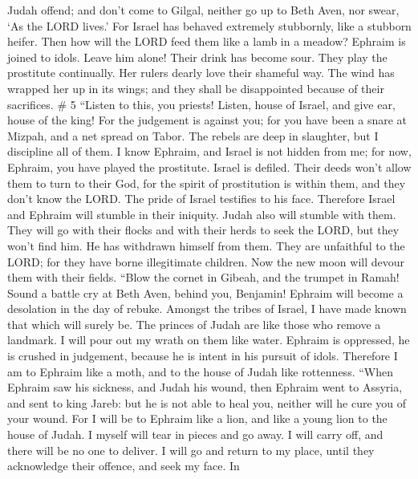 Judah offend; and don't come to Gilgal, neither go up to Beth Aven, nor
swear, `As the LORD lives.'  For Israel has behaved
extremely stubbornly, like a stubborn heifer. Then how will the LORD
feed them like a lamb in a meadow?  Ephraim is joined to
idols. Leave him alone!  Their drink has become sour.
They play the prostitute continually. Her rulers dearly love their
shameful way.  The wind has wrapped her up in its wings;
and they shall be disappointed because of their sacrifices. \# 5
 ``Listen to this, you priests! Listen, house of Israel,
and give ear, house of the king! For the judgement is against you; for
you have been a snare at Mizpah, and a net spread on Tabor.
 The rebels are deep in slaughter, but I discipline all of
them.  I know Ephraim, and Israel is not hidden from me;
for now, Ephraim, you have played the prostitute. Israel is defiled.
 Their deeds won't allow them to turn to their God, for
the spirit of prostitution is within them, and they don't know the LORD.
 The pride of Israel testifies to his face. Therefore
Israel and Ephraim will stumble in their iniquity. Judah also will
stumble with them.  They will go with their flocks and
with their herds to seek the LORD, but they won't find him. He has
withdrawn himself from them.  They are unfaithful to the
LORD; for they have borne illegitimate children. Now the new moon will
devour them with their fields.  ``Blow the cornet in
Gibeah, and the trumpet in Ramah! Sound a battle cry at Beth Aven,
behind you, Benjamin!  Ephraim will become a desolation in
the day of rebuke. Amongst the tribes of Israel, I have made known that
which will surely be.  The princes of Judah are like
those who remove a landmark. I will pour out my wrath on them like
water.  Ephraim is oppressed, he is crushed in judgement,
because he is intent in his pursuit of idols.  Therefore
I am to Ephraim like a moth, and to the house of Judah like rottenness.
 ``When Ephraim saw his sickness, and Judah his wound,
then Ephraim went to Assyria, and sent to king Jareb: but he is not able
to heal you, neither will he cure you of your wound.  For
I will be to Ephraim like a lion, and like a young lion to the house of
Judah. I myself will tear in pieces and go away. I will carry off, and
there will be no one to deliver.  I will go and return to
my place, until they acknowledge their offence, and seek my face. In
